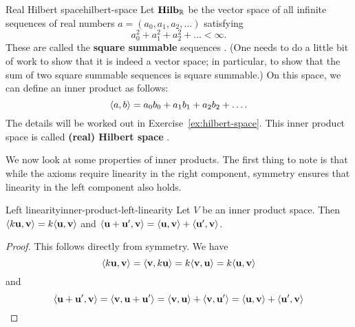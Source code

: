 \begin{example}{Real Hilbert space}{hilbert-space}
  Let $\mathbf{Hilb}_{\mathbb{R}}$ be the vector space of all infinite sequences of
  real numbers $a=(a_0,a_1,a_2,\ldots)$ satisfying
  \begin{equation*}
    a_0^2 + a_1^2 + a_2^2 + \ldots < \infty.
  \end{equation*}
  These are called the \textbf{square summable} sequences%
  . (One needs
  to do a little bit of work to show that it is indeed a vector space;
  in particular, to show that the sum of two square summable sequences
  is square summable.) On this space, we can
  define an inner product as follows:
  \begin{equation*}
    \langle a,b\rangle = a_0b_0 + a_1b_1 + a_2b_2 + \ldots.
  \end{equation*}
  The details will be worked out in Exercise~\ref{ex:hilbert-space}.
  This inner product space is called \textbf{(real) Hilbert space}%
  .
\end{example}

We now look at some properties of inner products. The first thing to
note is that while the axioms require linearity in the right
component, symmetry ensures that linearity in the left component also
holds.

\begin{proposition}{Left linearity}{inner-product-left-linearity}
  Let $V$ be an inner product space. Then
  $\iprod{k\vect{u},\vect{v}} = k\iprod{\vect{u},\vect{v}}$ and
  $\iprod{\vect{u}+\vect{u}',\vect{v}} = \iprod{\vect{u},\vect{v}} +
  \iprod{\vect{u}',\vect{v}}$.
\end{proposition}

\begin{proof}
  This follows directly from symmetry. We have
  \begin{equation*}
    \iprod{k\vect{u},\vect{v}}
    = \iprod{\vect{v},k\vect{u}}
    = k\iprod{\vect{v},\vect{u}}
    = k\iprod{\vect{u},\vect{v}}
  \end{equation*}
  and
  \begin{equation*}
    \iprod{\vect{u}+\vect{u}',\vect{v}}
    = \iprod{\vect{v},\vect{u}+\vect{u}'}
    = \iprod{\vect{v},\vect{u}} + \iprod{\vect{v},\vect{u}'}
    = \iprod{\vect{u},\vect{v}} + \iprod{\vect{u}',\vect{v}}
  \end{equation*}
\end{proof}

